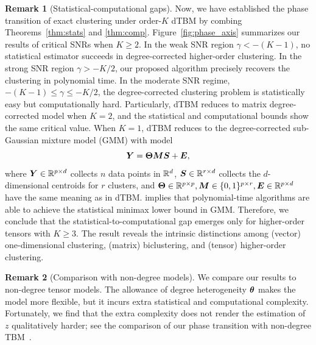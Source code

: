 \documentclass[lettersize,onecolumn,journal]{IEEEtran}
\theoremstyle{definition}
\theoremstyle{definition}
\newtheorem{rmk}{Remark}
\begin{document}
\begin{rmk}[Statistical-computational gaps]
Now, we have established the phase transition of exact clustering under order-$K$ dTBM by combing Theorems~\ref{thm:stats} and \ref{thm:comp}. Figure~\ref{fig:phase_axis} summarizes our results of critical SNRs when $K \geq 2$. In the weak SNR region $\gamma < -(K-1)$, no statistical estimator succeeds in degree-corrected higher-order clustering. In the strong SNR region $\gamma  > -K/2$, our proposed algorithm precisely recovers the clustering in polynomial time. In the moderate SNR regime, $-(K-1)\leq \gamma \leq -K/2$, the degree-corrected clustering problem is statistically easy but computationally hard. Particularly, dTBM reduces to matrix degree-corrected model when $K =2$, and the statistical and computational bounds show the same critical value. When $K =1$, dTBM reduces to the degree-corrected sub-Gaussian mixture model (GMM) with model
\begin{equation}
    \bm Y = \boldsymbol{\Theta} \bm M \bm S + \bm{E},
\end{equation}
where $\bm Y \in \mathbb{R}^{p \times d}$ collects $n$ data points in $\mathbb{R}^d$, $\bm S \in \mathbb{R}^{r \times d}$ collects the $d$-dimensional centroids for $r$ clusters, and $\boldsymbol{\Theta} \in \mathbb{R}^{p \times p}, \bm M \in \{0,1\}^{p \times r}, \bm{E} \in \mathbb{R}^{p \times d}$ have the same meaning as in dTBM. \cite{lu2016statistical} implies that polynomial-time algorithms are able to achieve the statistical minimax lower bound in GMM. Therefore, we conclude that the statistical-to-computational gap emerges only for higher-order tensors with $K \geq 3$. The result reveals the intrinsic distinctions among (vector) one-dimensional clustering, (matrix) biclustering, and (tensor) higher-order clustering. 
\end{rmk}


\begin{rmk}[Comparison with non-degree models]
We compare our results to non-degree tensor models. The allowance of degree heterogeneity $\boldsymbol{\theta}$ makes the model more flexible, but it incurs extra statistical and computational complexity. Fortunately, we find that the extra complexity does not render the estimation of $z$ qualitatively harder; see the comparison of our phase transition with non-degree TBM~\citep{han2020exact}. 
\end{rmk}
\end{document}
